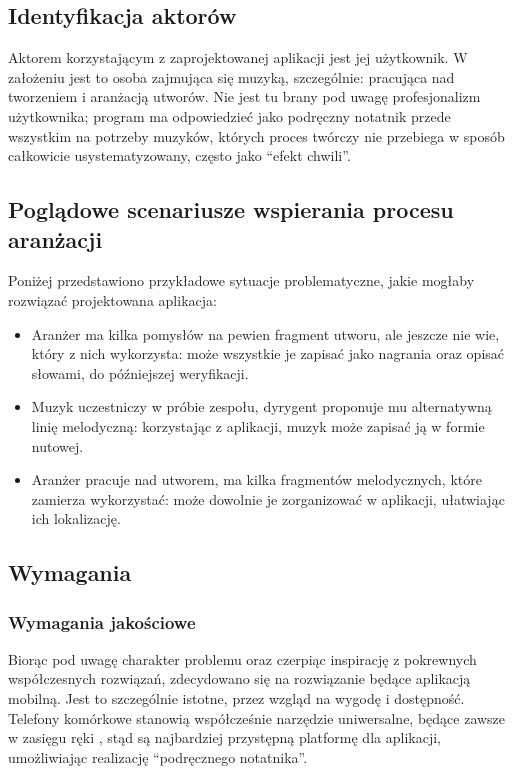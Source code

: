 \subsection{Identyfikacja aktorów}
Aktorem korzystającym z zaprojektowanej aplikacji jest jej użytkownik.
W założeniu jest to osoba zajmująca się muzyką, szczególnie: pracująca nad tworzeniem i aranżacją utworów.
Nie jest tu brany pod uwagę profesjonalizm użytkownika; program ma odpowiedzieć jako podręczny notatnik przede wszystkim
na potrzeby muzyków, których proces twórczy nie przebiega w sposób całkowicie usystematyzowany, często jako \enquote{efekt chwili}.

\subsection{Poglądowe scenariusze wspierania procesu aranżacji}
Poniżej przedstawiono przykładowe sytuacje problematyczne, jakie mogłaby rozwiązać projektowana aplikacja:
\begin{itemize}
	\item Aranżer ma kilka pomysłów na pewien fragment utworu, ale jeszcze nie wie, który z nich wykorzysta:
	      może wszystkie je zapisać jako nagrania oraz opisać słowami, do późniejszej weryfikacji.
	\item Muzyk uczestniczy w próbie zespołu, dyrygent proponuje mu alternatywną linię melodyczną:
	      korzystając z aplikacji, muzyk może zapisać ją w formie nutowej.
	\item Aranżer pracuje nad utworem, ma kilka fragmentów melodycznych, które zamierza wykorzystać:
	      może dowolnie je zorganizować w aplikacji, ułatwiając ich lokalizację.
\end{itemize}

\subsection{Wymagania}
\subsubsection{Wymagania jakościowe}
Biorąc pod uwagę charakter problemu oraz czerpiąc inspirację z pokrewnych współczesnych rozwiązań,
zdecydowano się na rozwiązanie będące aplikacją mobilną.
Jest to szczególnie istotne, przez wzgląd na wygodę i dostępność.
Telefony komórkowe stanowią współcześnie narzędzie uniwersalne, będące zawsze w zasięgu ręki \cite{10},
stąd są najbardziej przystępną platformę dla aplikacji, umożliwiając realizację \enquote{podręcznego notatnika}.

